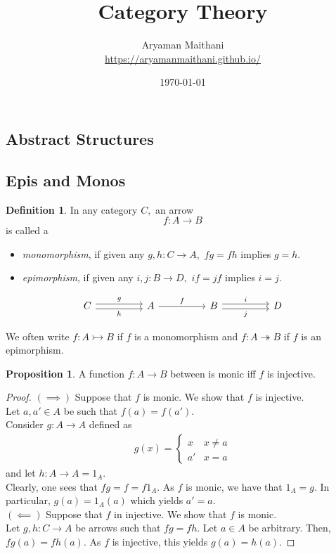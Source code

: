 \documentclass[11pt,leqno,landscape,semhelv]{seminar}
\title{\vspace{1cm} Category Theory}
\author{Aryaman Maithani\\\url{https://aryamanmaithani.github.io/}}
\date{\today}
\numberwithin{equation}{section}
\theoremstyle{definition}
\newtheorem{prop}[thm]{Proposition}
\newtheorem{defn}[thm]{Definition}
\numberwithin{thm}{section}
\numberwithin{equation}{section}
\renewcommand{\sec}[1]{%
\begin{slide}
\begin{center}
    \begin{center}
        \section{#1}
    \end{center}
\end{center}
\end{slide}}
\newcommand{\mono}{\rightarrowtail}
\newcommand{\epi}{\twoheadrightarrow}
\begin{document}
\maketitle
\newpage
\setcounter{section}{-1}
\tableofcontents


%
%
%
\sec{Abstract Structures}
\subsection{Epis and Monos}
\begin{defn} 
	In any category $C,$ an arrow
	\begin{equation*} 
		f:A\to B
	\end{equation*}
	is called a 
	\begin{itemize}
		\item \emph{monomorphism}, if given any $g, h:C\to A,$ $fg = fh$ implies $g = h.$
		\item \emph{epimorphism}, if given any $i, j:B\to D,$ $if = jf$ implies $i = j.$
	\end{itemize}
	\begin{equation*} 
		\begin{tikzcd}
		C \arrow[rr, "h"', shift right] \arrow[rr, "g", shift left] &  & A \arrow[rr, "f"] &  & B \arrow[rr, "i", shift left] \arrow[rr, "j"', shift right] &  & D
		\end{tikzcd}
	\end{equation*}
\end{defn}	
We often write $f:A\mono B$ if $f$ is a monomorphism and $f:A \epi B$ if $f$ is an epimorphism.
\begin{prop} \label{prop:monin}
	A function $f:A\to B$ between is monic iff $f$ is injective.
\end{prop}
\begin{proof} 
	$(\implies)$ Suppose that $f$ is monic. We show that $f$ is injective. \\
	Let $a, a' \in A$ be such that $f(a) = f(a').$\\
	Consider $g:A \to A$ defined as
	\begin{align*} 
		g(x) = \begin{cases}
			x & x \neq a\\
			a' & x = a
		\end{cases}
	\end{align*}
	and let $h:A \to A = 1_A.$\\
	Clearly, one sees that $fg = f = f1_A.$ As $f$ is monic, we have that $1_A = g.$ In particular, $g(a) = 1_A(a)$ which yields $a' = a.$\\
	$(\impliedby)$ Suppose that $f$ in injective. We show that $f$ is monic.\\
	Let $g, h:C\to A$ be arrows such that $fg = fh.$ Let $a \in A$ be arbitrary. Then, $fg(a) = fh(a).$ As $f$ is injective, this yields $g(a) = h(a).$
\end{proof}
\end{document}
